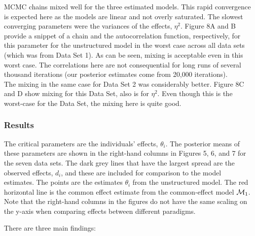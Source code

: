 \documentclass[american,man]{apa6}
\begin{document}
MCMC chains mixed well for the three estimated models. This rapid
convergence is expected here as the models are linear and not overly
saturated. The slowest converging parameters were the variances of the
effects, \(\eta^2\). Figure 8A and B provide a snippet of a chain and
the autocorrelation function, respectively, for this parameter for the
unstructured model in the worst case across all data sets (which was
from Data Set 1). As can be seen, mixing is acceptable even in this
worst case. The correlations here are not consequential for long runs of
several thousand iterations (our posterior estimates come from 20,000
iterations).\\The mixing in the same case for Data Set 2 was
considerably better. Figure 8C and D show mixing for this Data Set, also
is for \(\eta^2\). Even though this is the worst-case for the Data Set,
the mixing here is quite good.

\subsubsection{Results}\label{results}

The critical parameters are the individuals' effects, \(\theta_i\). The
posterior means of these parameters are shown in the right-hand columns
in Figures 5, 6, and 7 for the seven data sets. The dark grey lines that
have the largest spread are the observed effects, \(d_i\), and these are
included for comparison to the model estimates. The points are the
estimates \(\theta_i\) from the unstructured model. The red horizontal
line is the common effect estimate from the common-effect model
\({\cal M}_1\). Note that the right-hand columns in the figures do not have
the same scaling on the y-axis when comparing effects between different
paradigms.

There are three main findings:
\end{document}

